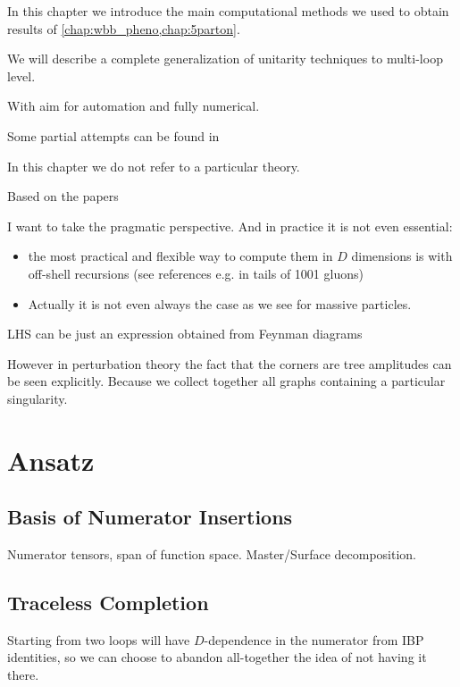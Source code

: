 In this chapter we introduce the main computational methods we used to obtain results of
\cref{chap:wbb_pheno,chap:5parton}. 

We will describe a complete generalization of unitarity techniques to multi-loop level.

With aim for automation and fully numerical.

Some partial attempts can be found in 


In this chapter we do not refer to a particular theory.


Based on the papers

I want to take the pragmatic perspective. And in practice it is not even essential:
\begin{itemize}
    \item       the most practical and flexible way to compute them in $D$ dimensions is with off-shell recursions (see references e.g. in tails of 1001 gluons)
    \item Actually it is not even always the case as we see for massive particles.
\end{itemize}

LHS can be just an expression obtained from Feynman diagrams

However in perturbation theory the fact that the corners are tree amplitudes can be seen explicitly.
Because we collect together all graphs containing a particular singularity.


\section{Ansatz}
\label{sec:ansatz_integrand}

\subsection{Basis of Numerator Insertions}
Numerator tensors, span of function space. Master/Surface decomposition.





\subsection{Traceless Completion}
\label{sec:traceless_completion}

Starting from two loops will have $D$-dependence in the numerator from IBP identities, so
we can choose to abandon all-together the idea of not having it there.

